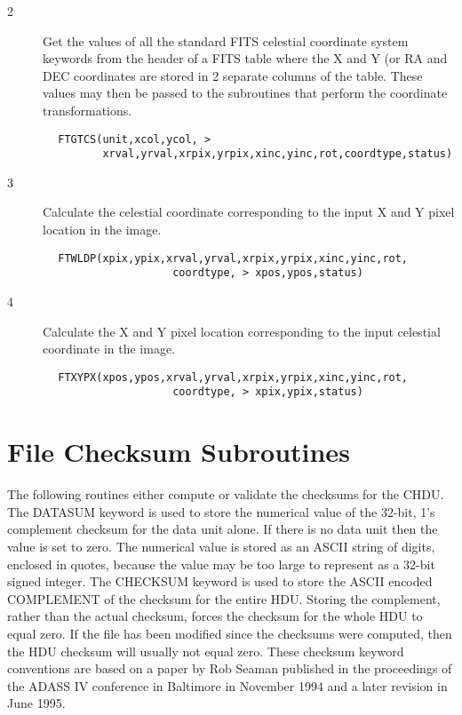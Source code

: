 \documentclass[11pt]{book}
\begin{document}
\begin{description}
\item[2 ] Get the values of all the standard FITS celestial coordinate system
    keywords from the header of a FITS table where the X and Y (or RA and
    DEC coordinates are stored in 2 separate columns of the table.
    These values may then be passed to the subroutines that perform the
   coordinate transformations.
\end{description}

\begin{verbatim}
        FTGTCS(unit,xcol,ycol, >
               xrval,yrval,xrpix,yrpix,xinc,yinc,rot,coordtype,status)
\end{verbatim}

\begin{description}
\item[3 ]  Calculate the celestial coordinate corresponding to the input
    X and Y pixel location in the image.
\end{description}

\begin{verbatim}
        FTWLDP(xpix,ypix,xrval,yrval,xrpix,yrpix,xinc,yinc,rot,
                          coordtype, > xpos,ypos,status)
\end{verbatim}

\begin{description}
\item[4 ]  Calculate the X and Y pixel location corresponding to the input
    celestial coordinate in the image.
\end{description}

\begin{verbatim}
        FTXYPX(xpos,ypos,xrval,yrval,xrpix,yrpix,xinc,yinc,rot,
                          coordtype, > xpix,ypix,status)
\end{verbatim}


\section{File Checksum Subroutines \label{FTPCKS}}

The following routines either compute or validate the checksums for the
CHDU.  The DATASUM keyword is used to store the numerical value of the
32-bit, 1's complement checksum for the data unit alone.  If there is
no data unit then the value is set to zero. The numerical value is
stored as an ASCII string of digits, enclosed in quotes, because the
value may be too large to represent as a 32-bit signed integer.  The
CHECKSUM keyword is used to store the ASCII encoded COMPLEMENT of the
checksum for the entire HDU.  Storing the complement, rather than the
actual checksum, forces the checksum for the whole HDU to equal zero.
If the file has been modified since the checksums were computed, then
the HDU checksum will usually not equal zero.  These checksum keyword
conventions are based on a paper by Rob Seaman published in the
proceedings of the ADASS IV conference in Baltimore in November 1994
and a later revision in June 1995.
\end{document}
